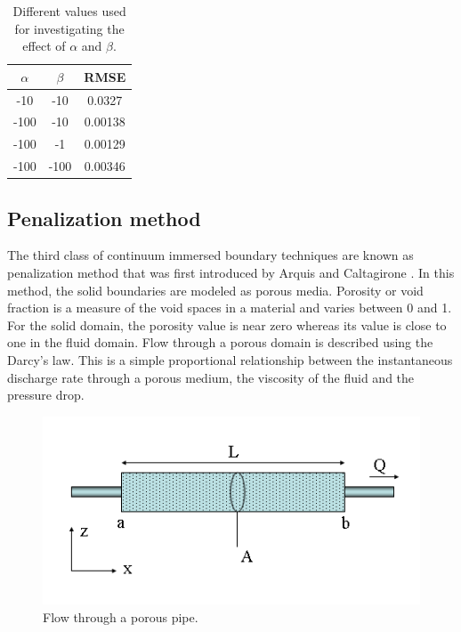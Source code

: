 \begin{table}[H]
\centering
\begin{tabular}{c | c | c}
     $\alpha$ & $\beta$ & RMSE \\ \hline \hline
     -10 & -10 & 0.0327 \\ \hline
     -100 & -10 & 0.00138 \\ \hline
     -100 & -1 & 0.00129 \\ \hline
     -100 & -100 & 0.00346 \\
\end{tabular}
\caption{Different values used for investigating the effect of $\alpha$ and $\beta$.}
\label{table:C3_virtualBoundaryResultConstantRSME}
\end{table}
\subsection{Penalization method}
The third class of continuum immersed boundary techniques are known as penalization method that was first introduced by Arquis and Caltagirone \cite{ arquis1984conditions}. In this method, the solid boundaries are modeled as porous media. Porosity or void fraction is a measure of the void spaces in a material and varies between 0 and 1. For the solid domain, the porosity value is near zero whereas its value is close to one in the fluid domain. Flow through a porous domain is described using the Darcy's law. This is a simple proportional relationship between the instantaneous discharge rate through a porous medium, the viscosity of the fluid and the pressure drop.

\begin{figure}[H]
    \centering
    \includegraphics[width=14.cm]{Chapter_3/figure/Darcys_Law.png}
    \caption{Flow through a porous pipe.}
    \label{fig:C3_darcyEquationPipe}
\end{figure}

